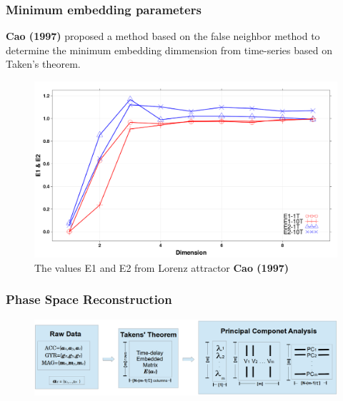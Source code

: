 \documentclass{beamer}
\begin{document}
\begin{frame}
\frametitle{Minimum embedding parameters}

\textbf{Cao (1997)} proposed a method 
based on the false neighbor method
to determine the minimum embedding dimmension
from time-series based on Taken's theorem.


\begin{figure}
\centering 
\includegraphics[scale=0.15]{e1e2cao1997} \\
The values E1 and E2 from Lorenz attractor \textbf{Cao (1997)}
\end{figure}
\end{frame}





\begin{frame}
\frametitle{Phase Space Reconstruction}

\begin{figure}
 \includegraphics[scale=.23]{diagram_v9} \\
\end{figure} 
 
\end{frame}
\end{document}
